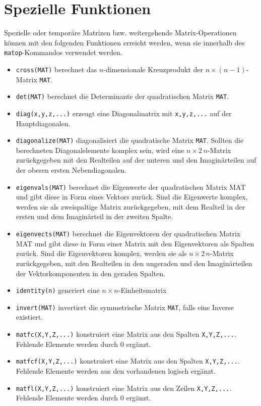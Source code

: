 \documentclass[DIV=14,headsepline,footsepline]{scrbook}
\begin{document}
			\section{Spezielle Funktionen}
				Spezielle oder temporäre Matrizen bzw. weitergehende Matrix-Operationen können mit den folgenden Funktionen erreicht werden, wenn sie innerhalb des \verb+matop+-Kommandos verwendet werden.
				\begin{itemize}
					\item \verb+cross(MAT)+ berechnet das $n$-dimensionale Kreuzprodukt der $n\times(n-1)$-Matrix \verb+MAT+.
					\item \verb+det(MAT)+ berechnet die Determinante der quadratischen Matrix \verb+MAT+.
					\item \verb+diag(x,y,z,...)+ erzeugt eine Diagonalmatrix mit \verb+x,y,z,...+ auf der Hauptdiagonalen.
					\item \verb+diagonalize(MAT)+ diagonalisiert die quadratische Matrix \verb+MAT+. Sollten die berechneten Diagonalelemente komplex sein, wird eine $n\times2\,n$-Matrix zurückgegeben mit den Realteilen auf der unteren und den Imaginärteilen auf der oberen ersten Nebendiagonalen.
					\item \verb+eigenvals(MAT)+ berechnet die Eigenwerte der quadratischen Matrix MAT und gibt diese in Form eines Vektors zurück. Sind die Eigenwerte komplex, werden sie als zweispaltige Matrix zurückgegeben, mit dem Realteil in der ersten und dem Imaginärteil in der zweiten Spalte.
					\item \verb+eigenvects(MAT)+ berechnet die Eigenvektoren der quadratischen Matrix MAT und gibt diese in Form einer Matrix mit den Eigenvektoren als Spalten zurück. Sind die Eigenvektoren komplex, werden sie als $n \times 2\,n$-Matrix zurückgegeben, mit den Realteilen in den ungeraden und den Imaginärteilen der Vektorkomponenten in den geraden Spalten.
					\item \verb+identity(n)+ generiert eine $n\times n$-Einheitsmatrix
					\item \verb+invert(MAT)+ invertiert die symmetrische Matrix \verb+MAT+, falls eine Inverse existiert.
					\item \verb+matfc(X,Y,Z,...)+ konstruiert eine Matrix aus den Spalten \verb+X,Y,Z,...+. Fehlende Elemente werden durch 0 ergänzt.
					\item \verb+matfcf(X,Y,Z,...)+ konstruiert eine Matrix aus den Spalten \verb+X,Y,Z,...+. Fehlende Elemente werden aus den vorhandenen logisch ergänzt.
					\item \verb+matfl(X,Y,Z,...)+ konstruiert eine Matrix aus den Zeilen \verb+X,Y,Z,...+. Fehlende Elemente werden durch 0 ergänzt.

\end{itemize}
\end{document}
